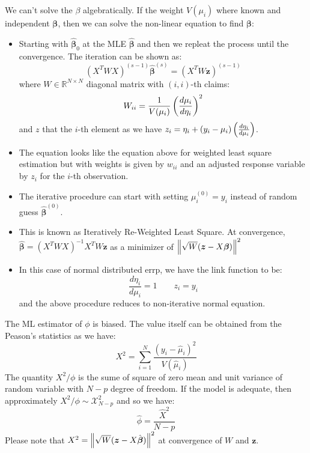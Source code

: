 \begin{remark}
    We can't solve the $\beta$ algebratically. If the weight $V(\mu_i)$ where known and independent $\boldsymbol \beta$, then we can solve the non-linear equation to find $\boldsymbol \beta$:
    \begin{itemize}
        \item Starting with $\hat{\boldsymbol \beta}_0$ at the MLE $\hat{\boldsymbol \beta}$ and then we repleat the process until the convergence. The iteration can be shown as:
        \begin{equation*}
            (X^TWX)^{(s-1)}\hat{\boldsymbol \beta}^{(s)} = (X^TW\boldsymbol z)^{(s-1)}
        \end{equation*}
        where $W \in\mathbb{R}^{N\times N}$ diagonal matrix with $(i,i)$-th claims:
        \begin{equation*}
            W_{ii} = \frac{1}{V(\mu_i)}\left( \frac{d\mu_i}{d\eta_i} \right)^2
        \end{equation*}
        and $z$ that the $i$-th element as we have $z_i = \eta_i + (y_i-\mu_i)\left( \frac{d\eta_i}{d\mu_i} \right)$. 
        \item The equation looks like the equation above for weighted least square estimation but with weights is given by $w_{ii}$ and an adjusted response variable by $z_i$ for the $i$-th observation. 
        \item The iterative procedure can start with setting $\mu^{(0)}_i = y_i$ instead of random guess $\hat{\boldsymbol \beta}^{(0)}$. 
        \item This is known as Iteratively Re-Weighted Least Square. At convergence, $\hat{\boldsymbol \beta} = (X^TWX)^{-1}X^TW\boldsymbol z$ as a minimizer of $\left\lVert\sqrt{W}(\boldsymbol z - X\boldsymbol \beta)\right\rVert^2$
        \item In this case of normal distributed errp,  we have the link function to be:
        \begin{equation*}
            \frac{d\eta_i}{d\mu_i} = 1 \qquad z_i=y_i
        \end{equation*}
        and the above procedure reduces to non-iterative normal equation. 
    \end{itemize}
\end{remark}

\begin{remark}
    The ML estimator of $\phi$ is biased. The value itself can be obtained from the Peason's statistics as we have:
    \begin{equation*}
        X^2 = \sum^N_{i=1} \frac{(y_i-\hat{\mu}_i)^2}{V(\hat{\mu}_i)}
    \end{equation*}
    The quantity $X^2/\phi$ is the sume of square of zero mean and unit variance of random variable with $N-p$ degree of freedom. If the model is adequate, then approximately $X^2/\phi\sim\mathcal{X}^2_{N-p}$ and so we have:
    \begin{equation*}
        \hat{\phi} = \frac{\hat{X}^2}{N-p}
    \end{equation*}
    Please note that $X^2 = \left\lVert\sqrt{W}(\boldsymbol z- X\hat{\boldsymbol \beta})\right\rVert^2$ at convergence of $W$ and $\boldsymbol z$. 
\end{remark}

